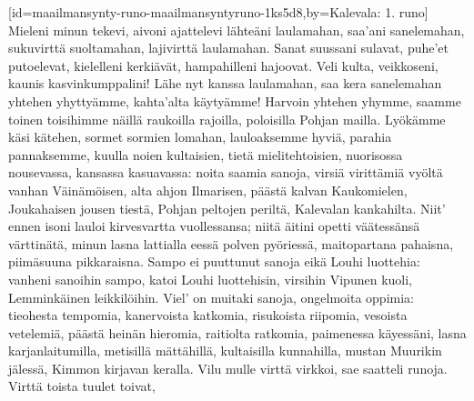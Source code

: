 %
\setcounter{ulSongNumber}{700}


[id={maailmansynty-runo-maailmansyntyruno-1ks5d8},by={Kalevala: 1. runo}]
  \beginverse
    Mieleni minun tekevi,
    aivoni ajattelevi
    lähteäni laulamahan,
    saa'ani sanelemahan,
    sukuvirttä suoltamahan,
    lajivirttä laulamahan.
    Sanat suussani sulavat,
    puhe'et putoelevat,
    kielelleni kerkiävät,
    hampahilleni hajoovat.
    Veli kulta, veikkoseni,
    kaunis kasvinkumppalini!
    Lähe nyt kanssa laulamahan,
    saa kera sanelemahan
    yhtehen yhyttyämme,
    kahta'alta käytyämme!
    Harvoin yhtehen yhymme,
    saamme toinen toisihimme
    näillä raukoilla rajoilla,
    poloisilla Pohjan mailla.
  \endverse
  \beginverse
    Lyökämme käsi kätehen,
    sormet sormien lomahan,
    lauloaksemme hyviä,
    parahia pannaksemme,
    kuulla noien kultaisien,
    tietä mielitehtoisien,
    nuorisossa nousevassa,
    kansassa kasuavassa:
    noita saamia sanoja,
    virsiä virittämiä
    vyöltä vanhan Väinämöisen,
    alta ahjon Ilmarisen,
    päästä kalvan Kaukomielen,
    Joukahaisen jousen tiestä,
    Pohjan peltojen periltä,
    Kalevalan kankahilta.
    Niit' ennen isoni lauloi
    kirvesvartta vuollessansa;
    niitä äitini opetti
    väätessänsä värttinätä,
    minun lasna lattialla
    eessä polven pyöriessä,
    maitopartana pahaisna,
    piimäsuuna pikkaraisna.
    Sampo ei puuttunut sanoja
    eikä Louhi luottehia:
    vanheni sanoihin sampo,
    katoi Louhi luottehisin,
    virsihin Vipunen kuoli,
    Lemminkäinen leikkilöihin.
  \endverse
  \beginverse
    Viel' on muitaki sanoja,
    ongelmoita oppimia:
    tieohesta tempomia,
    kanervoista katkomia,
    risukoista riipomia,
    vesoista vetelemiä,
    päästä heinän hieromia,
    raitiolta ratkomia,
    paimenessa käyessäni,
    lasna karjanlaitumilla,
  \endverse
  \beginverse
    metisillä mättähillä,
    kultaisilla kunnahilla,
    mustan Muurikin jälessä,
    Kimmon kirjavan keralla.
    Vilu mulle virttä virkkoi,
    sae saatteli runoja.
    Virttä toista tuulet toivat,
